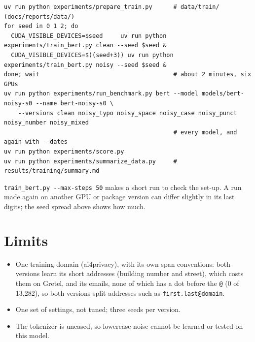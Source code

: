 \documentclass[10pt,a4paper]{article}
\newcommand{\file}[1]{\texttt{#1}}
\begin{document}
{\small
\begin{verbatim}
uv run python experiments/prepare_train.py      # data/train/ (docs/reports/data/)
for seed in 0 1 2; do
  CUDA_VISIBLE_DEVICES=$seed     uv run python experiments/train_bert.py clean --seed $seed &
  CUDA_VISIBLE_DEVICES=$((seed+3)) uv run python experiments/train_bert.py noisy --seed $seed &
done; wait                                      # about 2 minutes, six GPUs
uv run python experiments/run_benchmark.py bert --model models/bert-noisy-s0 --name bert-noisy-s0 \
    --versions clean noisy_typo noisy_space noisy_case noisy_punct noisy_number noisy_mixed
                                                # every model, and again with --dates
uv run python experiments/score.py
uv run python experiments/summarize_data.py     # results/training/summary.md
\end{verbatim}
}

\file{train\_bert.py -{}-max-steps 50} makes a short run to check the set-up. A run made again on
another GPU or package version can differ slightly in its last digits; the seed spread above shows
how much.

\section{Limits}

\begin{itemize}
\item One training domain (ai4privacy), with its own span conventions: both versions learn its
  short addresses (building number and street), which costs them on Gretel, and its emails, none
  of which has a dot before the \file{@} (0 of 13,282), so both versions split addresses such as
  \file{first.last@domain}.
\item One set of settings, not tuned; three seeds per version.
\item The tokenizer is uncased, so lowercase noise cannot be learned or tested on this model.
\end{itemize}
\end{document}

